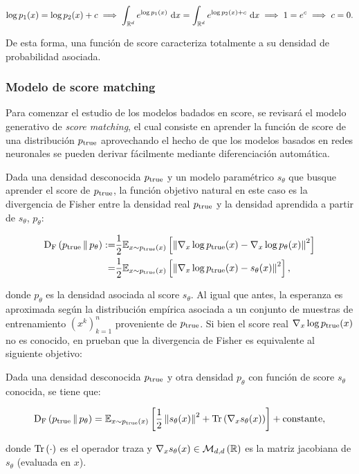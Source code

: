 \begin{equation*}
    \log p_1(x) = \log p_2(x)+c \implies \int_{\mathbb{R}^d} e^{\log p_1(x)} \,\operatorname{d}\! x = \int_{\mathbb{R}^d} e^{\log p_2(x)+c}\,\operatorname{d}\! x \implies 1 = e^c \implies c = 0 .
\end{equation*}

De esta forma, una función de score caracteriza totalmente a su densidad de probabilidad asociada.

\subsubsection{Modelo de score matching}

Para comenzar el estudio de los modelos badados en score, se revisará el modelo generativo de \textit{score matching}, el cual consiste en aprender la función de score de una distribución $p_{\operatorname{true}}$ aprovechando el hecho de que los modelos basados en redes neuronales se pueden derivar fácilmente mediante diferenciación automática.

Dada una densidad desconocida $p_{\operatorname{true}}$ y un modelo paramétrico $s_\theta$ que busque aprender el score de $p_{\operatorname{true}}$, la función objetivo natural en este caso es la divergencia de Fisher entre la densidad real $p_{\operatorname{true}}$ y la densidad aprendida a partir de $s_\theta$, $p_\theta$:

\begin{align*}
    \operatorname{D_F}\left(p_{\operatorname{true}}\,\|\,p_\theta\right) := & \frac{1}{2}\mathbb{E}_{x\sim p_{\operatorname{true}}(x)}\left[\left\lVert \nabla_x\log p_{\operatorname{true}}(x) - \nabla_x\log p_\theta(x) \right\rVert^2\right] \\
    =                        & \frac{1}{2}\mathbb{E}_{x\sim p_{\operatorname{true}}(x)}\left[\left\lVert \nabla_x\log p_{\operatorname{true}}(x) - s_\theta(x) \right\rVert^2\right] ,
\end{align*}

donde $p_\theta$ es la densidad asociada al score $s_\theta$. Al igual que antes, la esperanza es aproximada según la distribución empírica asociada a un conjunto de muestras de entrenamiento $(x^k)_{k=1}^n$ proveniente de $p_{\operatorname{true}}$. Si bien el score real $\nabla_x\log p_{\operatorname{true}}(x)$ no es conocido, en \cite{hyvarinen2005estimation} prueban que la divergencia de Fisher es equivalente al siguiente objetivo:

\begin{prop}
    Dada una densidad desconocida $p_{\operatorname{true}}$ y otra densidad $p_\theta$ con función de score $s_\theta$ conocida, se tiene que:

    \begin{equation*}
        \label{eq:sm_objective}
        \operatorname{D_F}\left(p_{\operatorname{true}}\,\|\,p_\theta\right) =
        \mathbb{E}_{x\sim p_{\operatorname{true}}(x)}\left[\frac{1}{2}\left\lVert s_\theta(x) \right\rVert^2 + \operatorname{Tr}\left(\nabla_x s_\theta(x)\right)\right] + \operatorname{constante} ,
    \end{equation*}

    donde $\operatorname{Tr}\left(\cdot\right)$ es el operador traza y $\nabla_x s_\theta(x)\in\mathcal{M}_{d,d}\left(\mathbb{R}\right)$ es la matriz jacobiana de $s_\theta$ (evaluada en $x$).
\end{prop}

